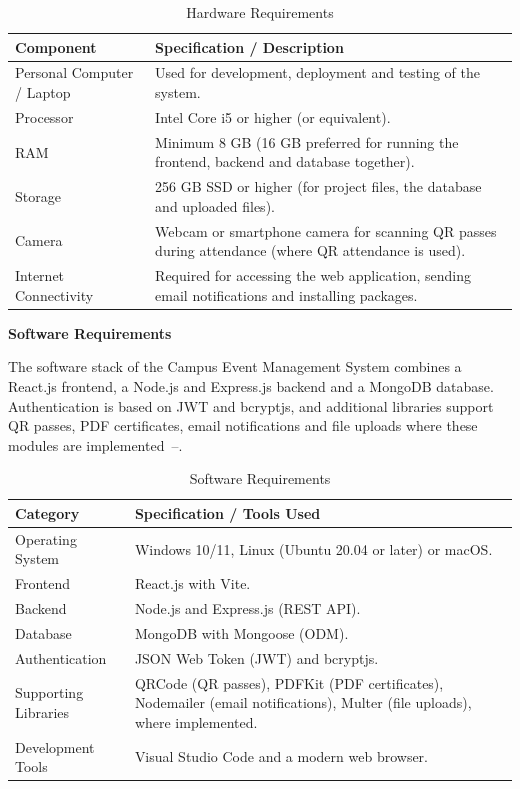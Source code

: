 \documentclass[12pt,a4paper]{report}
\begin{document}
\begin{table}[htbp]
\centering
\caption{Hardware Requirements}\label{tab:hw}
\begin{tabular}{|p{4.5cm}|p{8cm}|}
\hline \textbf{Component} & \textbf{Specification / Description}\\ \hline
Personal Computer / Laptop & Used for development, deployment and testing of the system.\\ \hline
Processor & Intel Core i5 or higher (or equivalent).\\ \hline
RAM & Minimum 8 GB (16 GB preferred for running the frontend, backend and database together).\\ \hline
Storage & 256 GB SSD or higher (for project files, the database and uploaded files).\\ \hline
Camera & Webcam or smartphone camera for scanning QR passes during attendance (where QR attendance is used).\\ \hline
Internet Connectivity & Required for accessing the web application, sending email notifications and installing packages.\\ \hline
\end{tabular}
\end{table}

\textbf{Software Requirements}

The software stack of the Campus Event Management System combines a React.js frontend, a Node.js and Express.js backend and a MongoDB database. Authentication is based on JWT and bcryptjs, and additional libraries support QR passes, PDF certificates, email notifications and file uploads where these modules are implemented~\cite{react}--\cite{nodejs}.

\begin{table}[htbp]
\centering
\caption{Software Requirements}\label{tab:sw}
\begin{tabular}{|p{4.5cm}|p{8cm}|}
\hline \textbf{Category} & \textbf{Specification / Tools Used}\\ \hline
Operating System & Windows 10/11, Linux (Ubuntu 20.04 or later) or macOS.\\ \hline
Frontend & React.js with Vite.\\ \hline
Backend & Node.js and Express.js (REST API).\\ \hline
Database & MongoDB with Mongoose (ODM).\\ \hline
Authentication & JSON Web Token (JWT) and bcryptjs.\\ \hline
Supporting Libraries & QRCode (QR passes), PDFKit (PDF certificates), Nodemailer (email notifications), Multer (file uploads), where implemented.\\ \hline
Development Tools & Visual Studio Code and a modern web browser.\\ \hline
\end{tabular}
\end{table}
\end{document}
